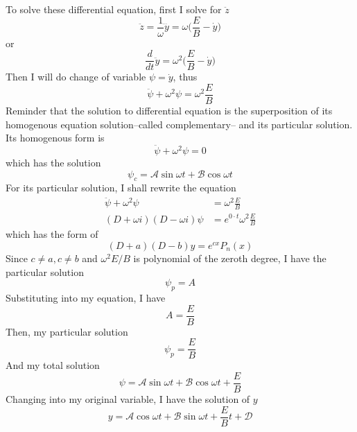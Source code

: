 \documentclass[../../../main.tex]{subfiles}
\begin{document}
To solve these differential equation, first I solve for $\ddot{z}$
\begin{equation*}
    \ddot{z}=\frac{1}{\omega}\dddot{y}=\omega\biggl(\frac{E}{B}-\dot{y}\biggr)
\end{equation*}
or 
\begin{equation*}
    \frac{d}{dt}\ddot{y}=\omega^2\biggl(\frac{E}{B}-\dot{y}\biggr)
\end{equation*}
Then I will do change of variable $\psi=\dot{y}$, thus
\begin{equation*}
    \ddot{\psi}+\omega^2\psi=\omega^2\frac{E}{B}
\end{equation*}
Reminder that the solution to differential equation is the superposition of its homogenous equation solution--called complementary-- and its particular solution. Its homogenous form is 
\begin{equation*}
    \ddot{\psi}+\omega^2\psi=0
\end{equation*}
which has the solution
\begin{equation*}
    \psi_c=\mathcal{A}\sin \omega t+\mathcal{B}\cos\omega t
\end{equation*}
For its particular solution, I shall rewrite the equation
\begin{align*}
    \ddot{\psi}+\omega^2\psi&=\omega^2\frac{E}{B}\\
    (D+\omega i)(D-\omega i)\psi&=e^{0\cdot t}\omega^2\frac{E}{B}
\end{align*}
which has the form of
\begin{equation*}
    (D+a)(D-b)y=e^{cx}P_n(x)
\end{equation*}
Since $c\neq a, c\neq b$ and $\omega^2E/B$ is polynomial of the zeroth degree, I have the particular solution
\begin{equation*}
    \psi_p=A
\end{equation*}
Substituting into my equation, I have
\begin{equation*}
    A=\frac{E}{B}
\end{equation*}
Then, my particular solution
\begin{equation*}
    \psi_p=\frac{E}{B}
\end{equation*}
And my total solution
\begin{equation*}
    \psi=\mathcal{A}\sin \omega t+\mathcal{B}\cos\omega t+\frac{E}{B}
\end{equation*}
Changing into my original variable, I have the solution of $y$
\begin{equation*}
    y=\mathcal{A}\cos \omega t+\mathcal{B}\sin\omega t+\frac{E}{B}t+\mathcal{D}
\end{equation*}
\end{document}
